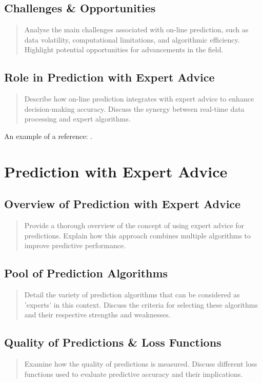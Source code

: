\documentclass[11pt]{article} %
\theoremstyle{plain}
\theoremstyle{definition}
\begin{document}
\subsection{Challenges \& Opportunities}
\begin{quote}
  Analyse the main challenges associated with on-line prediction, such as data volatility, computational limitations, and algorithmic efficiency. Highlight potential opportunities for advancements in the field.
\end{quote}

\subsection{Role in Prediction with Expert Advice}
\begin{quote}
  Describe how on-line prediction integrates with expert advice to enhance decision-making accuracy. Discuss the synergy between real-time data processing and expert algorithms.
\end{quote}

An example of a reference:
\cite{kalnishkan:2022}.
\cite{kalnishkan/vyugin:2008}
\cite{herbster/warmuth:1995}
\cite{vovk:2001}

\newpage

\section{Prediction with Expert Advice}
\subsection{Overview of Prediction with Expert Advice}
\begin{quote}
  Provide a thorough overview of the concept of using expert advice for predictions. Explain how this approach combines multiple algorithms to improve predictive performance.
\end{quote}

\subsection{Pool of Prediction Algorithms}
\begin{quote}
  Detail the variety of prediction algorithms that can be considered as 'experts' in this context. Discuss the criteria for selecting these algorithms and their respective strengths and weaknesses.
\end{quote}

\subsection{Quality of Predictions \& Loss Functions}
\begin{quote}
  Examine how the quality of predictions is measured. Discuss different loss functions used to evaluate predictive accuracy and their implications.
\end{quote}
\end{document}
